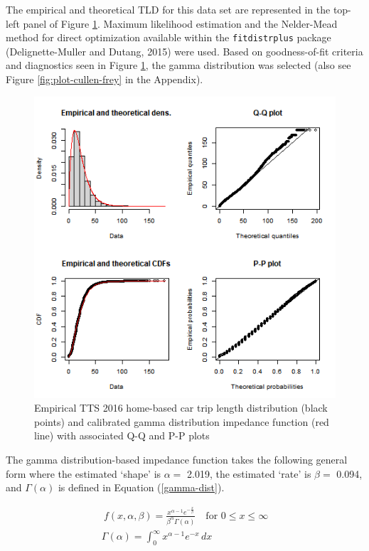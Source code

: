 \documentclass[]{elsarticle} %
\begin{document}
The empirical and theoretical TLD for this data set are represented in
the top-left panel of Figure \ref{fig:TLD-Gamma-plot}. Maximum
likelihood estimation and the Nelder-Mead method for direct optimization
available within the \texttt{fitdistrplus} package (Delignette-Muller
and Dutang, 2015) were used. Based on goodness-of-fit criteria and
diagnostics seen in Figure \ref{fig:TLD-Gamma-plot}, the gamma
distribution was selected (also see Figure \ref{fig:plot-cullen-frey} in
the Appendix).

\begin{figure}

{\centering \includegraphics[width=0.8\linewidth]{images/impedance_function} 

}

\caption{\label{fig:TLD-Gamma-plot}Empirical TTS 2016 home-based car trip length distribution (black points) and calibrated gamma distribution impedance function (red line) with associated Q-Q and P-P plots}\label{fig:TLD-Gamma-plot}
\end{figure}

The gamma distribution-based impedance function takes the following
general form where the estimated `shape' is \(\alpha=\) 2.019, the
estimated `rate' is \(\beta =\) 0.094, and \(\Gamma(\alpha)\) is defined
in Equation (\ref{gamma-dist}).

\begin{equation}
\label{gamma-dist}
\begin{array}{l}\ 
f(x, \alpha, \beta) = \frac {x^{\alpha-1}e^{-\frac{x}{\beta}}}{ \beta^{\alpha}\Gamma(\alpha)} \quad \text{for } 0 \leq x \leq \infty\\

\Gamma(\alpha) =  \int_{0}^{\infty} x^{\alpha-1}e^{-x} \,dx\\
\end{array}
\end{equation}
\end{document}
